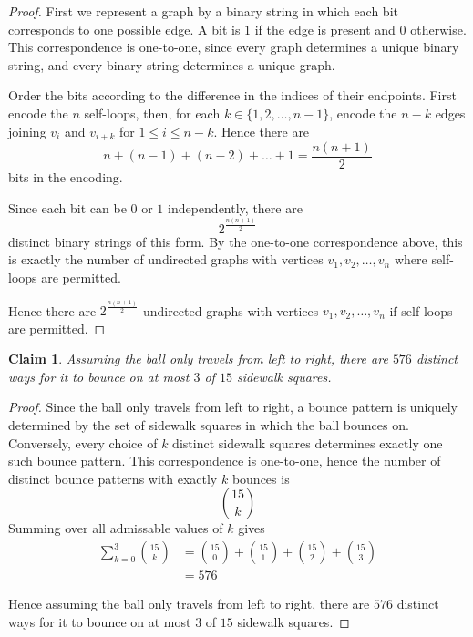\documentclass{article}
\newtheorem{claim}{Claim}
\begin{document}
\begin{proof}
    First we represent a graph by a binary string in which each bit corresponds to one possible edge. A bit 
    is $1$ if the edge is present and $0$ otherwise. This correspondence is one-to-one, since every graph 
    determines a unique binary string, and every binary string determines a unique graph.

    \medskip

    Order the bits according to the difference in the indices of their endpoints. First encode the $n$ 
    self-loops, then, for each $k \in \{1, 2, \dots, n - 1\}$, encode the $n - k$ edges joining $v_i$ and 
    $v_{i+k}$ for $1 \le i \le n - k$. Hence there are
    \[
    n + (n - 1) + (n - 2) + \dots + 1 = \frac{n(n+1)}{2}
    \]
    bits in the encoding.

    \medskip

    Since each bit can be $0$ or $1$ independently, there are
    \[
    2^{\frac{n(n+1)}{2}}
    \]
    distinct binary strings of this form. By the one-to-one correspondence above, this is exactly the number 
    of undirected graphs with vertices $v_1, v_2, \dots, v_n$ where self-loops are permitted.

    \medskip

    Hence there are $2^{\frac{n(n+1)}{2}}$ undirected graphs with vertices $v_1, v_2, \dots, v_n$ if 
    self-loops are permitted.
\end{proof}

\begin{claim}
    Assuming the ball only travels from left to right, there are $576$ distinct ways for it to bounce on 
    at most $3$ of $15$ sidewalk squares.
\end{claim}

\begin{proof}
    Since the ball only travels from left to right, a bounce pattern is uniquely determined by the set of 
    sidewalk squares in which the ball bounces on. Conversely, every choice of $k$ distinct sidewalk squares 
    determines exactly one such bounce pattern. This correspondence is one-to-one, hence the number of 
    distinct bounce patterns with exactly $k$ bounces is
    \[
    \binom{15}{k}
    \]
    Summing over all admissable values of $k$ gives
    \[
    \begin{aligned}
    \sum_{k=0}^{3}\binom{15}{k} &= \binom{15}{0} + \binom{15}{1} + \binom{15}{2} + \binom{15}{3} \\ 
    &= 576
    \end{aligned}
    \]

    \medskip

    Hence assuming the ball only travels from left to right, there are $576$ distinct ways for it to bounce 
    on at most $3$ of $15$ sidewalk squares.
\end{proof}
\end{document}
